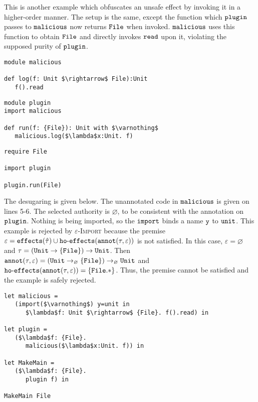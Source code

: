This is another example which obfuscates an unsafe effect by invoking it in a higher-order manner. The setup is the same, except the function which $\mathtt{plugin}$ passes to $\mathtt{malicious}$ now returns $\mathtt{File}$ when invoked. $\mathtt{malicious}$ uses this function to obtain $\mathtt{File}$ and directly invokes $\mathtt{read}$ upon it, violating the supposed purity of $\mathtt{plugin}$.

\begin{lstlisting}
module malicious

def log(f: Unit $\rightarrow$ File):Unit
   f().read
\end{lstlisting}

\begin{lstlisting}
module plugin
import malicious

def run(f: {File}): Unit with $\varnothing$
   malicious.log($\lambda$x:Unit. f)
\end{lstlisting}

\begin{lstlisting}
require File

import plugin

plugin.run(File)
\end{lstlisting}

The desugaring is given below. The unannotated code in $\mathtt{malicious}$ is given on lines 5-6. The selected authority is $\varnothing$, to be consistent with the annotation on $\mathtt{plugin}$. Nothing is being imported, so the $\mathtt{import}$ binds a name $\mathtt{y}$ to $\mathtt{unit}$. This example is rejected by \textsc{$\varepsilon$-Import} because the premise $\varepsilon = \mathtt{effects}(\hat \tau) \cup \mathtt{ho \hbox{-} effects}(\mathtt{annot}(\tau, \varepsilon))$ is not satisfied. In this case, $\varepsilon = \varnothing$ and $\tau = \mathtt{ (Unit \rightarrow \{ File \}) \rightarrow Unit }$. Then $\mathtt{annot}(\tau, \varepsilon) = \mathtt{ (Unit \rightarrow_{\varnothing} \{ File \}) \rightarrow_{\varnothing} Unit }$ and $\mathtt{ho \hbox{-} effects}(\mathtt{annot}(\tau, \varepsilon)) = \{ \mathtt{File.*} \}$. Thus, the premise cannot be satisfied and the example is safely rejected.


\begin{lstlisting}
let malicious =
   (import($\varnothing$) y=unit in
      $\lambda$f: Unit $\rightarrow$ {File}. f().read) in

let plugin =
   ($\lambda$f: {File}.
      malicious($\lambda$x:Unit. f)) in

let MakeMain =
   ($\lambda$f: {File}.
      plugin f) in

MakeMain File
\end{lstlisting}